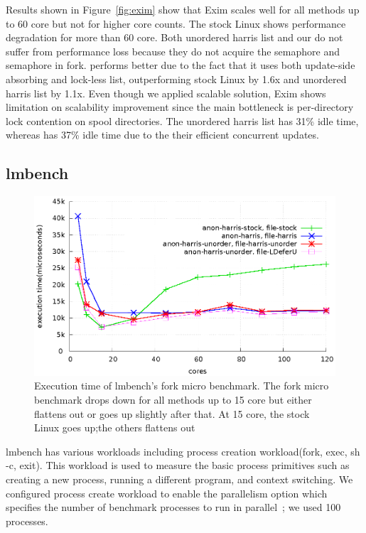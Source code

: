 Results shown in Figure~\ref{fig:exim} show that Exim scales well for all
methods up to 60 core but not for higher core counts.
The stock Linux shows performance degradation for more than 60 core.
Both unordered harris list
and our  do not suffer from performance loss 
because they do not acquire the 
semaphore and  semaphore in fork.
 performs better due to the fact that it uses both update-side
absorbing and lock-less list, outperforming stock Linux by 1.6x and unordered
harris list by 1.1x.
Even though we applied scalable solution, Exim shows limitation on scalability
improvement
since the main bottleneck is per-directory lock contention on spool
directories.
The unordered harris list has 31\% idle time, whereas  has 37\% idle
time due to the their efficient concurrent updates.

\subsection{lmbench}
\begin{figure}[tb]
  \begin{center}
    \includegraphics[scale=0.65]{graph/lmbench.eps}
  \end{center}
  \caption{Execution time of lmbench's fork micro benchmark. The fork micro
  benchmark drops down for all methods up to 15 core but either flattens out or
  goes up slightly after that. At 15 core, the stock Linux goes up;the others
  flattens out}
  \label{fig:MicroBench}
\end{figure}

lmbench has various workloads including process creation workload(fork,
exec, sh -c, exit).
This workload is used to measure the basic process primitives such as creating
a new process, running a different program, and context switching. 
We configured process create workload to enable the parallelism option which
specifies the number of benchmark processes to run in
parallel~\cite{mcvoy1996lmbench}; we used 100 processes.

